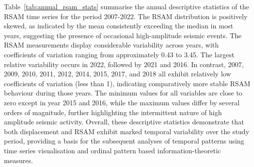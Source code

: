 \documentclass[12pt,a4paper]{article}
\begin{document}
Table~\ref{tab:annual_rsam_stats} summarise the annual descriptive statistics of the RSAM time series for the period 2007-2022. 
The RSAM distribution is positively skewed, as indicated by the mean consistently exceeding the median in most years, suggesting the presence of occasional high-amplitude seismic events. The RSAM measurements display considerable variability across years, with coefficients of variation ranging from approximately 0.43 to 3.45. The largest relative variability occurs in 2022, followed by 2021 and 2016. In contrast, 2007, 2009, 2010, 2011, 2012, 2014, 2015, 2017, and 2018 all exhibit relatively low coefficients of variation (less than 1), indicating comparatively more stable RSAM behaviour during those years. The minimum values for all variables are close to zero except in year 2015 and 2016, while the maximum values differ by several orders of magnitude, further highlighting the intermittent nature of high amplitude seismic activity. Overall, these descriptive statistics demonstrate that both displacement and RSAM exhibit marked temporal variability over the study period, providing a basis for the subsequent analyses of temporal patterns using time series visualisation and ordinal pattern based information-theoretic measures.
\end{document}
